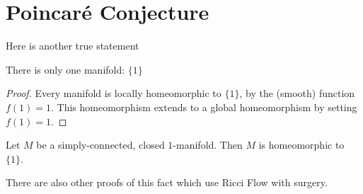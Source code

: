 \setcounter{section}{0}

\section{Poincar\'{e} Conjecture}
Here is another true statement
\begin{center}
  There is only one manifold: $\{1\}$
\end{center}

\begin{proof}
  Every manifold is locally homeomorphic to $\{1\}$, by the 
  (smooth) function $f(1) = 1$. This homeomorphism 
  extends to a global homeomorphism by setting $f(1)=1$.
\end{proof}

\begin{cor}
  Let $M$ be a simply-connected, closed $1$-manifold. Then 
  $M$ is homeomorphic to $\{1\}$.
\end{cor}

There are also other proofs of this fact which use 
Ricci Flow with surgery.

